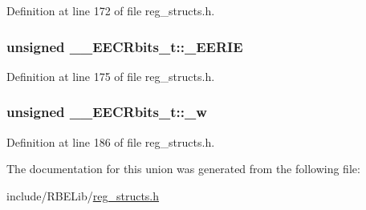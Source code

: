 Definition at line 172 of file reg\+\_\+structs.\+h.

\hypertarget{union_____e_e_c_rbits__t_aa1f71b84eb4aacca790b6da1121e7a35}{
\subsubsection[{\+\_\+\+E\+E\+R\+I\+E}]{\setlength{\rightskip}{0pt plus 5cm}unsigned \+\_\+\+\_\+\+E\+E\+C\+Rbits\+\_\+t\+::\+\_\+\+E\+E\+R\+I\+E}}\label{union_____e_e_c_rbits__t_aa1f71b84eb4aacca790b6da1121e7a35}


Definition at line 175 of file reg\+\_\+structs.\+h.

\hypertarget{union_____e_e_c_rbits__t_a8384ea2b9a07f8501c0d4a00a282a1d4}{
\subsubsection[{\+\_\+w}]{\setlength{\rightskip}{0pt plus 5cm}unsigned \+\_\+\+\_\+\+E\+E\+C\+Rbits\+\_\+t\+::\+\_\+w}}\label{union_____e_e_c_rbits__t_a8384ea2b9a07f8501c0d4a00a282a1d4}


Definition at line 186 of file reg\+\_\+structs.\+h.



The documentation for this union was generated from the following file\+:\begin{DoxyCompactItemize}
\item 
include/\+R\+B\+E\+Lib/\hyperlink{reg__structs_8h}{reg\+\_\+structs.\+h}\end{DoxyCompactItemize}
